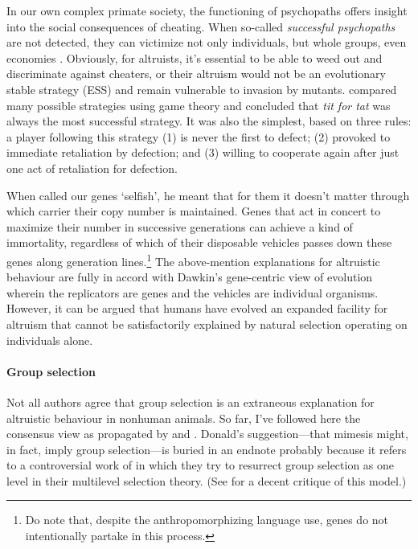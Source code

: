 \documentclass{article}
\begin{document}
In our own complex primate society, the functioning of psychopaths offers
insight into the social consequences of cheating. When so-called
\emph{successful psychopaths} are not detected, they can victimize not only
individuals, but whole groups, even economies \citep{babiak1995, boddy2006,
boddy2010, kirkman2005}. Obviously, for altruists, it's essential to be able to
weed out and discriminate against cheaters, or their altruism would not be an
evolutionary stable strategy (ESS) and remain vulnerable to invasion by
mutants. \citet*{axelrod1981} compared many possible strategies using game
theory and concluded that \emph{tit for tat} was always the most successful
strategy. It was also the simplest, based on three rules: a player following
this strategy (1) is never the first to defect; (2) provoked to immediate
retaliation by defection; and (3) willing to cooperate again after just one act
of retaliation for defection.

When \citet{dawkins1976} called our genes ‘selfish’, he meant that for them it
doesn't matter through which carrier their copy number is maintained. Genes
that act in concert to maximize their number in successive generations can
achieve a kind of immortality, regardless of which of their disposable vehicles
passes down these genes along generation lines.\footnote{Do note that, despite the
anthropomorphizing language use, genes do not intentionally partake in this
process.} The above-mention explanations for altruistic behaviour are fully in
accord with Dawkin's gene-centric view of evolution wherein the replicators are
genes and the vehicles are individual organisms. However, it can be argued that
humans have evolved an expanded facility for altruism that cannot be
satisfactorily explained by natural selection operating on individuals alone.

\paragraph{Group selection}

Not all authors agree that group selection is an extraneous explanation for
altruistic behaviour in nonhuman animals. So far, I've followed here the
consensus view as propagated by \citet{hamilton1964} and \citet{dawkins1976}.
Donald's suggestion---that mimesis might, in fact, imply group selection---is
buried in an endnote \citep[p.~338]{donald2001} probably because it refers to a
controversial work of \citet{sober1999} in which they try to resurrect group
selection as one level in their multilevel selection theory. (See
\citealp{dennett2002} for a decent critique of this model.)
\end{document}
